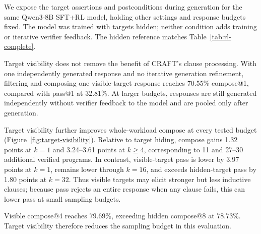 We expose the target assertions and postconditions during generation for
the same Qwen3-8B SFT+RL model, holding other settings and response
budgets fixed.  The model was trained with targets hidden; neither condition
adds training or iterative verifier feedback.  The hidden reference matches
Table~\ref{tab:rl-complete}.

Target visibility does not remove the benefit of CRAFT's clause processing.
With one independently generated response and no iterative generation
refinement, filtering and composing one visible-target response reaches
70.55\% compose@1, compared with pass@1 at 32.81\%.  At larger budgets, responses are
still generated independently without verifier feedback to the model and are
pooled only after generation.

Target visibility further improves whole-workload compose at every tested
budget (Figure~\ref{fig:target-visibility}).  Relative to target hiding,
compose gains 1.32 points at \(k=1\) and 3.24--3.61 points at \(k\ge4\),
corresponding to 11 and 27--30 additional verified programs. In contrast,
visible-target pass is lower by 3.97 points at \(k=1\), remains lower through
\(k=16\), and exceeds hidden-target pass by 1.80 points at \(k=32\). Thus
visible targets may elicit stronger but less inductive clauses; because pass
rejects an entire response when any clause fails, this can lower pass at small
sampling budgets.

Visible compose@4 reaches 79.69\%, exceeding hidden compose@8 at 78.73\%.
Target visibility therefore reduces the sampling budget in this
evaluation.

